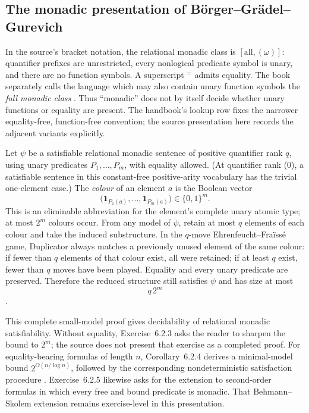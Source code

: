
\subsection{The monadic presentation of B\"orger--Gr\"adel--Gurevich}
\label{sec:p09-presentation-n-c-008}

In the source's bracket notation, the relational monadic class is
\([\mathrm{all},(\omega)]\): quantifier prefixes are unrestricted, every
nonlogical predicate symbol is unary, and there are no function symbols.  A
superscript \({}^{=}\) admits equality.  The book separately calls the language
which may also contain unary function symbols the \emph{full monadic class}
\cite[pp.~249--250]{BorgerGradelGurevich1997}.  Thus ``monadic'' does not by
itself decide whether unary functions or equality are present.  The handbook's
lookup row fixes the narrower equality-free, function-free convention; the
source presentation here records the adjacent variants explicitly.

Let \(\psi\) be a satisfiable relational monadic sentence of positive
quantifier rank \(q\), using unary predicates \(P_1,\ldots,P_m\), with equality
allowed.  (At quantifier rank (0), a satisfiable sentence in this
constant-free positive-arity vocabulary has the trivial one-element case.)  The
\emph{colour} of an element \(a\) is the Boolean vector
\[
 \bigl(\mathbf 1_{P_1(a)},\ldots,\mathbf 1_{P_m(a)}\bigr)
 \in\{0,1\}^m.
\]
This is an eliminable abbreviation for the element's complete unary atomic
type; at most \(2^m\) colours occur.  From any model of \(\psi\), retain at
most \(q\) elements of each colour and take the induced substructure.  In the
\(q\)-move Ehrenfeucht--Fra\"iss\'e game, Duplicator always matches a previously
unused element of the same colour: if fewer than \(q\) elements of that colour
exist, all were retained; if at least \(q\) exist, fewer than \(q\) moves have
been played.  Equality and every unary predicate are preserved.  Therefore the
reduced structure still satisfies \(\psi\) and has size at most
\[
 q\,2^m
\]
\cite[prop.~6.2.1]{BorgerGradelGurevich1997}.

This complete small-model proof gives decidability of relational monadic
satisfiability.  Without equality, Exercise~6.2.3 asks the reader to sharpen
the bound to \(2^m\); the source does not present that exercise as a completed
proof.  For equality-bearing formulas of length \(n\), Corollary~6.2.4 derives
a minimal-model bound \(2^{O(n/\log n)}\), followed by the corresponding
nondeterministic satisfaction procedure
\cite[pp.~250--251]{BorgerGradelGurevich1997}.  Exercise~6.2.5 likewise asks for
the extension to second-order formulas in which every free and bound predicate
is monadic.  That Behmann--Skolem extension remains exercise-level in this
presentation.


